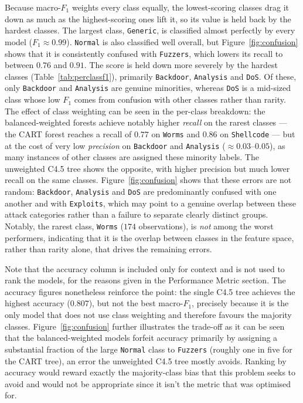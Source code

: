 \documentclass[conference]{IEEEtran}
\begin{document}
Because macro-$F_1$ weights every class equally, the lowest-scoring classes drag it down as much as
the highest-scoring ones lift it, so its value is held back by the hardest classes. The largest class, \texttt{Generic}, is classified almost perfectly by every model
($F_1 \approx 0.99$). \texttt{Normal} is also classified well overall, but Figure~\ref{fig:confusion}
shows that it is consistently confused with \texttt{Fuzzers}, which lowers its recall to between
$0.76$ and $0.91$. The score is held down more severely by the hardest classes (Table~\ref{tab:perclassf1}),
primarily \texttt{Backdoor}, \texttt{Analysis} and \texttt{DoS}. Of these, only \texttt{Backdoor}
and \texttt{Analysis} are genuine minorities, whereas \texttt{DoS} is a mid-sized class whose low
$F_1$ comes from confusion with other classes rather than rarity. The effect of class
weighting can be seen in the per-class breakdown: the balanced-weighted forests achieve notably higher
\emph{recall} on the rarest classes --- the CART forest reaches a recall of $0.77$ on \texttt{Worms}
and $0.86$ on \texttt{Shellcode} --- but at the cost of very low \emph{precision} on \texttt{Backdoor}
and \texttt{Analysis} ($\approx 0.03$--$0.05$), as many instances of other classes are assigned these
minority labels. The unweighted C4.5 tree shows the opposite, with higher precision but much
lower recall on the same classes. Figure~\ref{fig:confusion} shows that these errors are not random:
\texttt{Backdoor}, \texttt{Analysis} and \texttt{DoS} are predominantly confused with one another and
with \texttt{Exploits}, which may point to a genuine overlap between these attack categories rather
than a failure to separate clearly distinct groups. Notably, the rarest class, \texttt{Worms}
($174$ observations), is \emph{not} among the worst performers, indicating that it is the overlap
between classes in the feature space, rather than rarity alone, that drives the remaining errors.

Note that the accuracy column is included only for context and is not used to rank the models, for the
reasons given in the Performance Metric section. 
The accuracy figures nonetheless reinforce the point: the single C4.5 tree achieves the highest accuracy ($0.807$),
but not the best macro-$F_1$, precisely because it is the only model that does not use class weighting
and therefore favours the majority classes. 
Figure~\ref{fig:confusion} further illustrates the trade-off as it can be seen that the balanced-weighted
models forfeit accuracy primarily by assigning a substantial fraction of the large \texttt{Normal}
class to \texttt{Fuzzers} (roughly one in five for the CART tree), an error the unweighted C4.5 tree
mostly avoids. Ranking by accuracy would reward exactly the majority-class bias that this problem
seeks to avoid and would not be appropriate since it isn't the metric that was optimised for.
\end{document}
